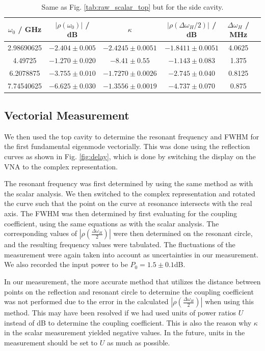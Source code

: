 \documentclass[a4paper]{report}
\numberwithin{equation}{section}
\begin{document}
\begin{table}[htb!]
	\centering
	\begin{tabular}{|c|c|c|c|c|c|}
		\hline $\omega_0$ / GHz & $\left| \rho(\omega_0) \right|$ / dB & $\kappa$ & $\left| \rho(\Delta\omega_H / 2) \right|$ / dB & $\Delta\omega_H$ / MHz\\ 
		\hline 2.98690625 & $-2.404 \pm 0.005$ & $-2.4245 \pm 0.0051$ & $-1.8411 \pm 0.0051$ & 4.0625 \\ 
		\hline 4.49725 & $-1.270 \pm 0.020$ & $-8.41 \pm 0.55$ & $-1.143 \pm 0.083$ & 1.375 \\
		\hline 6.2078875 & $-3.755 \pm 0.010$ & $ -1.7270 \pm 0.0026$ & $-2.745 \pm 0.040$ & 0.8125 \\
		\hline 7.74540625 & $-6.625 \pm 0.030$ & $-1.3556 \pm 0.0019$ & $-4.737 \pm 0.070$ & 0.875 \\ 
		\hline
	\end{tabular}
	\caption{Same as Fig. \ref{tab:raw_scalar_top} but for the side cavity. }
	\label{tab:raw_scalar_side}
\end{table}


\subsection{Vectorial Measurement}

We then used the top cavity to determine the resonant frequency and FWHM for the
first fundamental eigenmode vectorially. This was done using the reflection
curves as shown in Fig. \ref{fig:delay}, which is done by switching the display on the VNA to the complex representation. \par 

The resonant frequency was first determined by using the same method as with the
scalar analysis. We then switched to the complex representation and rotated the
curve such that the point on the curve at resonance intersects with the real
axis. The FWHM was then determined by first evaluating for the coupling
coefficient, using the same equations as with the scalar analysis. The
corresponding values of $|\rho(\frac{\Delta\omega_H}{2})|$ were then determined
on the resonant circle, and the resulting frequency values were tabulated.
The fluctuations of the measurement were again taken into account as uncertainties
in our measurement. We also recorded the input power to be $P_0 = 1.5 \pm 0.1$dB. \par 

In our measurement, the more accurate method that utilizes the distance between points on the reflection and resonant circle 
to determine the coupling coefficient was not performed due to the error in the calculated $|\rho(\frac{\Delta\omega_H}{2})|$
when using this method. This may have been resolved if we had used units of power ratios $U$ instead of dB to determine the 
coupling coefficient. This is also the reason why $\kappa$ in the scalar measurement yielded negative values. In the future,
units in the measurement should be set to $U$ as much as possible. \par 
\end{document}

